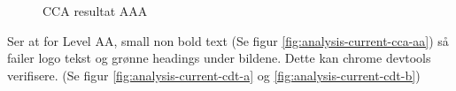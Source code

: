\begin{figure}[H]
    \centering
    \caption{CCA resultat AAA}
    \label{fig:analysis-current-cca-aaa}
\end{figure}

Ser at for Level AA, small non bold text (Se figur \ref{fig:analysis-current-cca-aa}) så failer logo tekst og grønne headings under bildene. Dette kan chrome devtools verifisere. (Se figur \ref{fig:analysis-current-cdt-a} og \ref{fig:analysis-current-cdt-b})

